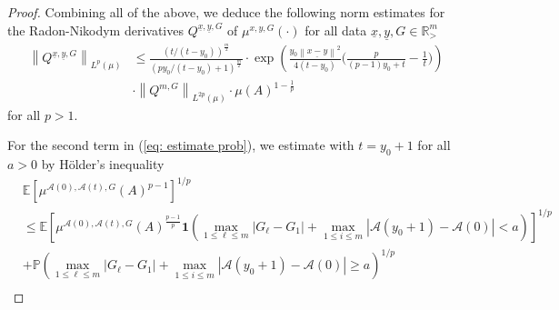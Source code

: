 \documentclass[11pt, reqno]{amsart}
\numberwithin{equation}{section}
\newcommand{\R}{\ensuremath{\mathbb{R}}}
\newcommand{\norm}[1]{\left\lVert#1\right\rVert}
\begin{document}
\begin{proof}
Combining all of the above, we deduce the following norm estimates for the Radon-Nikodym derivatives $Q^{\underline{x}, \underline{y}, G}$ of $\mu^{x, y, G}(\cdot)$ for all data $\underline{x}, \underline{y}, G\in \R^m_{>}$
\begin{equation*}
    \begin{array}{cc}
         \norm{Q^{\underline{x}, \underline{y}, G}}_{L^{p}(\mu)}& \le \displaystyle\frac{(t/(t-y_0))^{\frac{m}{2}}}{(py_0/(t-y_0)+1)^{\frac{m}{2}}}\cdot \exp\left({\frac{y_0\norm{\underline{x-y}}^2}{4(t-y_0)}\big(\frac{p}{(p-1)y_0+t}-\frac{1}{t}\big)}\right)\\
         & \cdot \norm{Q^{m, G}}_{L^{2p}(\mu)}\cdot\mu(A)^{1-\frac{1}{p}}
    \end{array}
\end{equation*}
for all $p>1$. 

For the second term in (\ref{eq: estimate prob}), we estimate with $t = y_0+1$ for all $a>0$ by H\"{o}lder's inequality
    \begin{equation*}
        \begin{array}{ll}
             &\mathbb{E}[\mu^{\mathcal{A}(0), \mathcal{A}(t), G}(A)^{p-1}]^{1/p}\\
             &\le \mathbb{E}\left[\mu^{\mathcal{A}(0), \mathcal{A}(t), G}(A)^{\frac{p-1}{p}}\mathbf{1}\left(\displaystyle \max_{1\le \ell \le m}|G_\ell - G_1| + \max_{1\le i \le m}|\mathcal{A}(y_0+1)-\mathcal{A}(0)|<a\right)\right]^{1/p}\\
             & + \mathbb{P}\left(\displaystyle \max_{1\le \ell \le m}|G_\ell - G_1| + \max_{1\le i \le m}|\mathcal{A}(y_0+1)-\mathcal{A}(0)|\ge a\right)^{1/p}\\
        \end{array}
    \end{equation*}


\end{proof}
\end{document}
